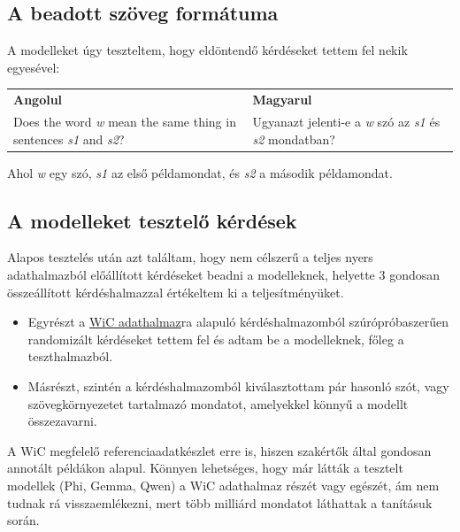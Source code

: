\documentclass[12pt]{report}
\theoremstyle{definition}
\begin{document}
\subsection{A beadott szöveg formátuma}

A modelleket úgy teszteltem, hogy eldöntendő kérdéseket tettem fel nekik egyesével:

\newenvironment{linguisticexample}
  {\par\medskip\noindent\small
   \begin{tabular}{p{0.45\textwidth}p{0.45\textwidth}}
   \textbf{Angolul} & \textbf{Magyarul} \\}
  {\end{tabular}\par\medskip}

\begin{linguisticexample}
Does the word \textit{w} mean the same thing in sentences \textit{s1} and \textit{s2}? &
Ugyanazt jelenti-e a \textit{w} szó az \textit{s1} és \textit{s2} mondatban?
\end{linguisticexample}

Ahol \textit{w} egy szó, \textit{s1} az első példamondat, és \textit{s2} a második példamondat.


\subsection{A modelleket tesztelő kérdések}
Alapos tesztelés után azt találtam, hogy nem célszerű a teljes nyers adathalmazból előállított kérdéseket beadni a modelleknek, helyette 3 gondosan összeállított kérdéshalmazzal értékeltem ki a teljesítményüket. %
\begin{itemize}
	\item Egyrészt a \href{https://pilehvar.github.io/wic/package/WiC\_dataset.zip}{WiC adathalmaz}ra alapuló kérdéshalmazomból szúrópróbaszerűen randomizált kérdéseket tettem fel és adtam be a modelleknek, főleg a  teszthalmazból.
    \item Másrészt, szintén a kérdéshalmazomból kiválasztottam pár hasonló szót, vagy szövegkörnyezetet tartalmazó mondatot, amelyekkel könnyű a modellt összezavarni.
\end{itemize}
A WiC megfelelő referenciaadatkészlet erre is, hiszen szakértők által gondosan annotált példákon alapul. Könnyen lehetséges, hogy már látták a tesztelt modellek (Phi, Gemma, Qwen) a WiC adathalmaz részét vagy egészét, ám nem tudnak rá visszaemlékezni, mert több milliárd mondatot láthattak a tanításuk során.
\end{document}
